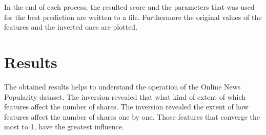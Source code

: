 In the end of each process, the resulted score and the parameters that was used for the best prediction are written to a file. Furthermore the original values of the features and the inverted ones are plotted.



\section{Results}

The obtained results helps to understand the operation of the Online News Popularity dataset. The inversion revealed that what kind of extent of which features affect the number of shares. The inversion revealed the extent of how features affect the number of shares one by one. Those features that converge the most to 1, have the greatest influence.\medskip

